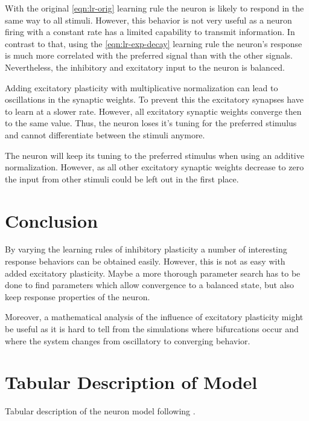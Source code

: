 \documentclass[11pt,a4paper]{scrartcl}
\begin{document}
With the original \ref{eqn:lr-orig} learning rule the neuron is likely to 
respond in the same way to all stimuli. However, this behavior is not very 
useful as a neuron firing with a constant rate has a limited capability to 
transmit information.  In contrast to that, using the \ref{eqn:lr-exp-decay} 
learning rule the neuron's response is much more correlated with the preferred 
signal than with the other signals.  Nevertheless, the inhibitory and excitatory 
input to the neuron is balanced.

Adding excitatory plasticity with multiplicative normalization can lead to 
oscillations in the synaptic weights.  To prevent this the excitatory synapses 
have to learn at a slower rate. However, all excitatory synaptic weights 
converge then to the same value.  Thus, the neuron loses it's tuning for the 
preferred stimulus and cannot differentiate between the stimuli anymore.

The neuron will keep its tuning to the preferred stimulus when using an additive 
normalization. However, as all other excitatory synaptic weights decrease to 
zero the input from other stimuli could be left out in the first place.

\section{Conclusion} \label{sec:conclusion}
By varying the learning rules of inhibitory plasticity a number of interesting 
response behaviors can be obtained easily. However, this is not as easy with 
added excitatory plasticity. Maybe a more thorough parameter search has to be 
done to find parameters which allow convergence to a balanced state, but also 
keep response properties of the neuron.

Moreover, a mathematical analysis of the influence of excitatory plasticity 
might be useful as it is hard to tell from the simulations where bifurcations 
occur and where the system changes from oscillatory to converging behavior.

\newpage
\appendix
\section{Tabular Description of Model}
Tabular description of the neuron model following \textcite{Nordlie:2009gy}.

\newcommand{\tblsec}[3]{\multicolumn{#1}{l}{\color{white}\cellcolor{black}%
        \makebox[0pt]{\textsf{#2}}\hspace{0.5\linewidth}%
        \makebox[0pt][c]{\textsf{#3}}} \\ \addlinespace}
\end{document}
